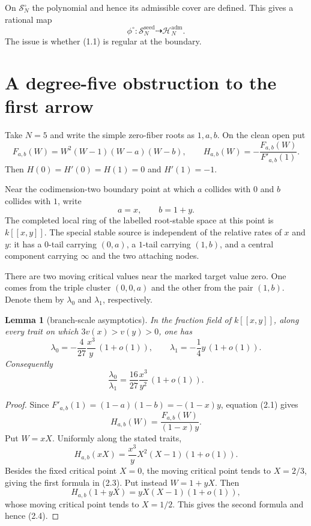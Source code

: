 \documentclass[11pt]{article}
\newtheorem{lemma}[theorem]{Lemma}
\begin{document}
On $\mathscr S_N^\circ$ the polynomial and hence its admissible cover are
defined.  This gives a rational map
\[
 \phi^\circ:\mathscr S_N^{\mathrm{seed}}
        \dashrightarrow\mathscr H_N^{\mathrm{adm}}.       \tag{1.1}
\]
The issue is whether (1.1) is regular at the boundary.

\section{A degree-five obstruction to the first arrow}

Take $N=5$ and write the simple zero-fiber roots as $1,a,b$.  On the clean
open put
\[
 F_{a,b}(W)=W^2(W-1)(W-a)(W-b),\qquad
 H_{a,b}(W)=-\frac{F_{a,b}(W)}{F'_{a,b}(1)}.          \tag{2.1}
\]
Then $H(0)=H'(0)=H(1)=0$ and $H'(1)=-1$.

Near the codimension-two boundary point at which $a$ collides with $0$ and
$b$ collides with $1$, write
\[
 a=x,\qquad b=1+y.                                   \tag{2.2}
\]
The completed local ring of the labelled root-stable space at this point is
$k[[x,y]]$.  The special stable source is independent of the relative rates
of $x$ and $y$: it has a $0$-tail carrying $(0,a)$, a $1$-tail carrying
$(1,b)$, and a central component carrying $\infty$ and the two attaching
nodes.

There are two moving critical values near the marked target value zero.
One comes from the triple cluster $(0,0,a)$ and the other from the pair
$(1,b)$.  Denote them by $\lambda_0$ and $\lambda_1$, respectively.

\begin{lemma}[branch-scale asymptotics]\label{lem:asymptotics}
In the fraction field of $k[[x,y]]$, along every trait on which
$3v(x)>v(y)>0$, one has
\[
 \lambda_0=-\frac4{27}\frac{x^3}{y}\,(1+o(1)),
 \qquad
 \lambda_1=-\frac14y\,(1+o(1)).                     \tag{2.3}
\]
Consequently
\[
 \frac{\lambda_0}{\lambda_1}
   =\frac{16}{27}\frac{x^3}{y^2}\,(1+o(1)).         \tag{2.4}
\]
\end{lemma}

\begin{proof}
Since $F'_{a,b}(1)=(1-a)(1-b)=-(1-x)y$, equation (2.1) gives
\[
 H_{a,b}(W)=\frac{F_{a,b}(W)}{(1-x)y}.                \tag{2.5}
\]
Put $W=xX$.  Uniformly along the stated traits,
\[
 H_{a,b}(xX)=\frac{x^3}{y}X^2(X-1)(1+o(1)).
\]
Besides the fixed critical point $X=0$, the moving critical point tends to
$X=2/3$, giving the first formula in (2.3).  Put instead $W=1+yX$.  Then
\[
 H_{a,b}(1+yX)=yX(X-1)(1+o(1)),
\]
whose moving critical point tends to $X=1/2$.  This gives the second formula
and hence (2.4).
\end{proof}
\end{document}

